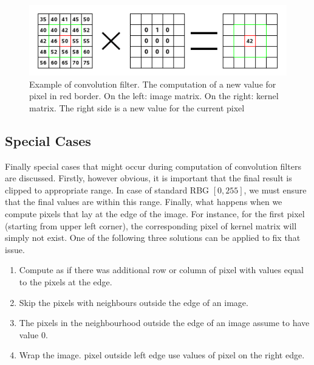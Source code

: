 \documentclass{article}
\begin{document}
\begin{figure}[H]
\centering

  \includegraphics[width=0.9\linewidth]{res/convo.png}
  
\caption{Example of convolution filter. The computation of a new value for pixel in red border. On the left: image matrix. On the right: kernel matrix. The right side is a new value for the current pixel}
\label{fig:convo}
\end{figure}

\subsection{Special Cases}


Finally special cases that might occur during computation of convolution filters are discussed. Firstly, however obvious, it is important that the final result is clipped to appropriate range. In case of standard RBG $[0 ,255]$, we must ensure that the final values are within this range. Finally, what happens when we compute pixels that lay at the edge of the image. For instance, for the first pixel (starting from upper left corner), the corresponding pixel of kernel matrix will simply not exist. One of the following three solutions can be applied to fix that issue.
\begin{enumerate}
	\item Compute as if there was additional row or column of pixel with values equal to the pixels at the edge.
	\item Skip the pixels with neighbours outside the edge of an image.
	\item The pixels in the neighbourhood outside the edge of an image assume to have value 0.
	\item Wrap the image. pixel outside left edge use values of pixel on the right edge.
\end{enumerate}

\end{document}
